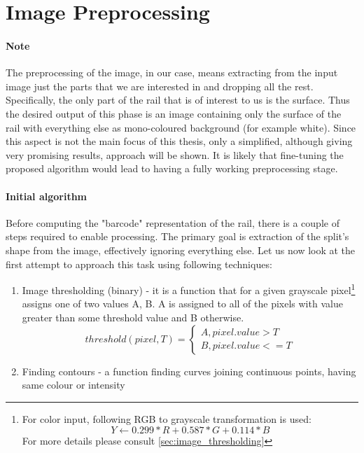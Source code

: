\section{Image Preprocessing}
\paragraph{Note}
The preprocessing of the image, in our case, means extracting from the input image just the parts that we are interested in and dropping all the rest. Specifically, the only part of the rail that is of interest to us is the surface. Thus the desired output of this phase is an image containing only the surface of the rail with everything else as mono-coloured background (for example white). Since this aspect is not the main focus of this thesis, only a simplified, although giving very promising results, approach will be shown. It is likely that fine-tuning the proposed algorithm would lead to having a fully working preprocessing stage.

\paragraph{Initial algorithm}
Before computing the "barcode" representation of the rail, there is a couple of steps required to enable processing. The primary goal is extraction of the split's shape from the image, effectively ignoring everything else. Let us now look at the first attempt to approach this task using following techniques:

\begin{enumerate}
	\item Image thresholding (binary) - it is a function that for a given grayscale pixel\footnote{For color input, following RGB to grayscale transformation is used: \begin{equation*}Y \gets 0.299 * R + 0.587 * G + 0.114 * B\end{equation*}For more details please consult \autoref{sec:image_thresholding}} assigns one of two values {A, B}. A is assigned to all of the pixels with value greater than some threshold value and B otherwise.
	$$
	threshold (pixel, T) = \begin{cases}
		A, pixel.value > T \\
		B, pixel.value <= T
	\end{cases}
	$$
	\item Finding contours - a function finding curves joining continuous points, having same colour or intensity
\end{enumerate}

